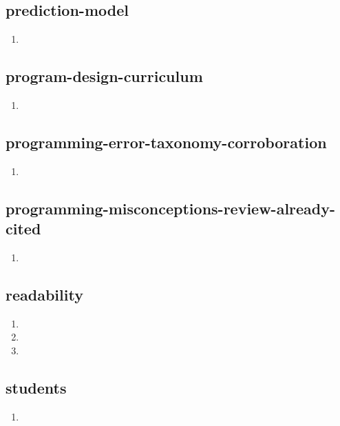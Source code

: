 \documentclass{article}
\begin{document}
\subsection{prediction-model}
\begin{enumerate}
\item {}
\end{enumerate}

\subsection{program-design-curriculum}
\begin{enumerate}
\item {}
\end{enumerate}

\subsection{programming-error-taxonomy-corroboration}
\begin{enumerate}
\item {}
\end{enumerate}

\subsection{programming-misconceptions-review-already-cited}
\begin{enumerate}
\item {}
\end{enumerate}

\subsection{readability}
\begin{enumerate}
\item {}
\item {}
\item {}
\end{enumerate}

\subsection{students}
\begin{enumerate}
\item {}
\end{enumerate}
\end{document}
